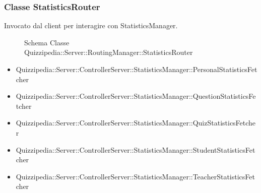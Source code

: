 \subsubsection{Classe StatisticsRouter}
Invocato dal client per interagire con StatisticsManager.
\begin{figure}[H]
\centering
\noindent{}
\caption{Schema Classe Quizzipedia::Server::RoutingManager::StatisticsRouter}
\end{figure}
\begin{itemize}
\item Quizzipedia::Server::ControllerServer::StatisticsManager::PersonalStatisticsFetcher
\item Quizzipedia::Server::ControllerServer::StatisticsManager::QuestionStatisticsFetcher
\item Quizzipedia::Server::ControllerServer::StatisticsManager::QuizStatisticsFetcher
\item Quizzipedia::Server::ControllerServer::StatisticsManager::StudentStatisticsFetcher
\item Quizzipedia::Server::ControllerServer::StatisticsManager::TeacherStatisticsFetcher
\end{itemize}
